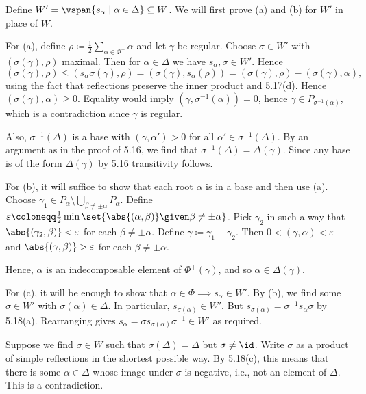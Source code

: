Define $W' = \vspan{s_\alpha\mid \alpha \in \Delta} \subseteq W$.
We will first prove (a) and (b) for  $W'$ in place of $W$.

For (a), define $\rho\coloneqq \frac{1}{2}\sum_{\alpha \in \Phi^+}\alpha$ and
let $\gamma$ be regular. Choose $\sigma \in W'$ with
$(\sigma(\gamma), \rho)$ maximal. Then for $\alpha \in \Delta$ we have
$s_\alpha, \sigma \in W'$. Hence
\[ (\sigma(\gamma), \rho)\leq (s_\alpha\sigma(\gamma), \rho) = (\sigma(\gamma), s_\alpha(\rho)) = (\sigma(\gamma), \rho) - (\sigma(\gamma), \alpha), \]
using the fact that reflections preserve the inner product and 5.17(d).
Hence $(\sigma(\gamma),\alpha)\geq 0$. Equality would imply $(\gamma, \sigma^{-1}(\alpha)) = 0$,
hence $\gamma \in P_{\sigma^{-1}(\alpha)}$, which is a contradiction since
$\gamma$ is regular.

Also, $\sigma^{-1}(\Delta)$ is a base with $(\gamma, \alpha')> 0$ for all
$\alpha' \in \sigma^{-1}(\Delta)$.
By an argument as in the proof of 5.16, we find that
$\sigma^{-1}(\Delta) = \Delta(\gamma)$.
Since any base is of the form $\Delta(\gamma)$ by 5.16 transitivity follows.

For (b), it will suffice to show that each root $\alpha$ is in a base
and then use (a). Choose  $\gamma_1 \in P_\alpha \setminus \bigcup_{\beta\neq \pm\alpha} P_\alpha$.
Define $\varepsilon\coloneqq \frac{1}{2}\min \set{\abs{(\alpha, \beta)}\given \beta\neq \pm\alpha}$.
Pick $\gamma_2$ in such a way that  $\abs{(\gamma_2, \beta)}<\varepsilon$ for
each $\beta \neq \pm\alpha$. Define $\gamma \coloneqq \gamma_1+\gamma_2$.
Then $0 < (\gamma, \alpha) < \varepsilon$ and $\abs{(\gamma, \beta)}>\varepsilon$
for each $\beta\neq\pm\alpha$.

Hence, $\alpha$ is an indecomposable element of $\Phi^+(\gamma)$, and so
$\alpha \in \Delta(\gamma)$.

For (c), it will be enough to show that $\alpha \in \Phi\implies s_\alpha \in W'$.
By (b), we find some $\sigma \in W'$ with $\sigma(\alpha) \in \Delta$.
In particular, $s_{\sigma(\alpha)} \in W'$. But
$s_{\sigma(\alpha)} = \sigma^{-1}s_\alpha\sigma$ by 5.18(a). Rearranging
gives $s_\alpha = \sigma s_{\sigma(\alpha)}\sigma^{-1} \in W'$ as required.

Suppose we find $\sigma \in W$ such that $\sigma(\Delta) = \Delta$ but
$\sigma\neq\id$. Write $\sigma$ as a product of simple reflections in the shortest
possible way. By 5.18(c), this means that there is some $\alpha \in \Delta$
whose image under $\sigma$ is negative, i.e., not an element of $\Delta$.
This is a contradiction.

